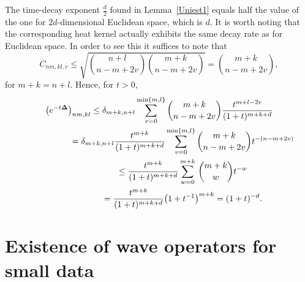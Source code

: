 \documentclass[pdftex]{sigma}
\begin{document}
\begin{remark}
The time-decay exponent $\frac d2$ found in  Lemma~\ref{Uniest1} equals half
the value of the one for $2d$-dimensional Euclidean space, which
is $d$. It is worth noting that the corresponding heat kernel actually exhibits the
same decay rate as for Euclidean space. In order to see this it
suf\/f\/ices to note that
\[
C_{nm,kl,v}\leq\sqrt{{n+l\choose n-m+2v}{m+k\choose n-m+2v}}=
{m+k\choose n-m+2v} ,
\]
for $m+k=n+l$. Hence, for $t>0$,
\begin{gather*}
\left(e^{-t{\bf{\Delta}}}\right)_{nm,kl} \leq
\delta_{m+k,n+l}\sum_{v=0}^{\min\{m,l\}} {m+k\choose n-m+2v}
 \frac{t^{m+l-2v}}{(1+t)^{m+k+d}}\\
\hphantom{\left(e^{-t{\bf{\Delta}}}\right)_{nm,kl}}{}
= \delta_{m+k,n+l}\frac{t^{m+k}}{(1+t)^{m+k+d}}
\sum_{v=0}^{\min\{m,l\}} {m+k\choose n-m+2v}
 t^{-(n-m+2v)}\\
\hphantom{\left(e^{-t{\bf{\Delta}}}\right)_{nm,kl}}{}
 \leq \frac{t^{m+k}}{(1+t)^{m+k+d}}
\sum_{w=0}^{m+k}\,{m+k\choose w} t^{-w}\\
\hphantom{\left(e^{-t{\bf{\Delta}}}\right)_{nm,kl}}{}
= \frac{t^{m+k}}{(1+t)^{m+k+d}}\big(1+t^{-1}\big)^{m+k} = (1+t)^{-d} .
\end{gather*}
\end{remark}



\section{Existence of wave operators for small data}
\label{secth3}
\end{document}
